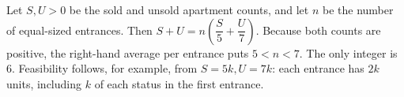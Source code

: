 Let $S,U>0$ be the sold and unsold apartment counts, and let $n$ be the number of equal-sized entrances. Then $S+U=n(\dfrac{S}{5}+\dfrac{U}{7})$. Because both counts are positive, the right-hand average per entrance puts $5<n<7$. The only integer is $\boxed6$. Feasibility follows, for example, from $S=5k,U=7k$: each entrance has $2k$ units, including $k$ of each status in the first entrance.
